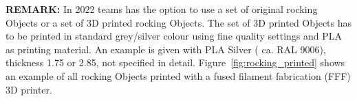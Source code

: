 \textbf{REMARK:} In 2022 teams has the option to use a set of original rocking Objects or a set of 3D printed rocking Objects. The set of 3D printed Objects has to be printed in standard grey/silver colour using fine quality settings and PLA as printing material. An example is given with PLA Silver ( ca. RAL 9006), thickness 1.75 or 2.85, not specified in detail.
Figure~\ref{fig:rocking_printed} shows an example of all rocking Objects printed with a fused filament fabrication (FFF) 3D printer. 



